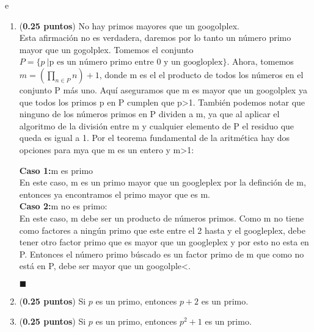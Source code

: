 e\documentclass[fontsize=12pt]{scrartcl}
\begin{document}
\begin{enumerate}
		\item ({\bf 0.25 puntos})
		 No hay primos mayores que un googolplex. \\
                 Esta afirmación no es verdadera, daremos por lo tanto un número primo mayor que un gogolplex.
                 Tomemos el conjunto \\$P = \{p ~ | \text {p es un número primo entre 0 y un googloplex} \}$.
                 Ahora, tomemos
                 $m =  (\prod_{n \in P} n )  + 1$, donde m es el el producto de todos los números en el conjunto P más uno.
                 Aquí aseguramos que m es mayor que un googolplex ya que todos los primos p en P cumplen que p>1. También podemos notar que ninguno de los números primos en P dividen a m, ya que al aplicar el algoritmo de la división entre m y cualquier elemento de P el residuo que queda es igual a 1. Por el teorema fundamental de la aritmética hay dos opciones para mya que m es un entero y m>1:

                 \textbf{Caso 1:}m es primo\\
                 En este caso, m es un primo mayor que un googleplex por la definción de m, entonces ya encontramos el primo mayor que es m.\\
                 \textbf{Caso 2:}m no es primo:\\
                 En este caso, m debe ser un producto de números primos. Como m no tiene como factores a ningún primo que este entre el 2 hasta y el googleplex, debe tener otro factor primo que es mayor que un googleplex y por esto no esta en P.
                Entonces el número primo búscado es un factor primo de m que como no está en P, debe ser mayor que un googolple<.
		\begin{flushright}
                  $\blacksquare$
                \end{flushright}

		\item ({\bf 0.25 puntos})
		Si $p$ es un primo, entonces $ p + 2 $ es un primo.
		
		\item ({\bf 0.25 puntos})
		Si $ p $ es un primo, entonces $ p^{2} + 1 $ es un primo.


\end{enumerate}
\end{document}
